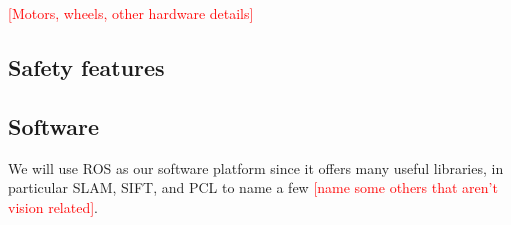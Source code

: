 \documentclass{paper}
\newcommand \todo[1]{\textcolor{red}{[#1]}}
\begin{document}
	\todo{Motors, wheels, other hardware details}

\subsection*{Safety features}





\subsection*{Software}

	We will use ROS as our software platform since it offers many useful libraries, in particular SLAM, SIFT, and PCL to name a few \todo{name some others that aren't vision related}.    
\end{document}
